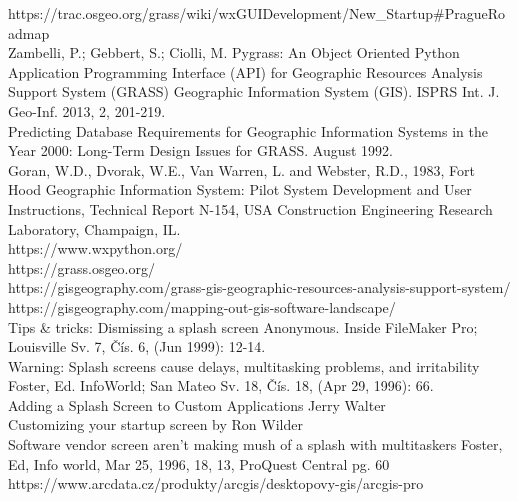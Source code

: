 \documentclass[a4paper,10pt,twoside]{article}
\begin{document}
\noindent
\large

https://trac.osgeo.org/grass/wiki/wxGUIDevelopment/New\_Startup\#PragueRoadmap \\

Zambelli, P.; Gebbert, S.; Ciolli, M. Pygrass: An Object Oriented Python Application Programming Interface (API) for Geographic Resources Analysis Support System (GRASS) Geographic Information System (GIS). ISPRS Int. J. Geo-Inf. 2013, 2, 201-219. \\

Predicting Database Requirements for Geographic Information Systems in the Year 2000: Long-Term Design Issues for GRASS. August 1992.\\

Goran, W.D., Dvorak, W.E., Van Warren, L. and Webster, R.D., 1983, Fort Hood Geographic Information System: Pilot System Development and User Instructions, Technical Report N-154, USA Construction Engineering Research Laboratory, Champaign, IL.\\

https://www.wxpython.org/\\

https://grass.osgeo.org/\\

https://gisgeography.com/grass-gis-geographic-resources-analysis-support-system/\\

https://gisgeography.com/mapping-out-gis-software-landscape/\\

Tips \& tricks: Dismissing a splash screen Anonymous. Inside FileMaker Pro; Louisville Sv. 7, Čís. 6,  (Jun 1999): 12-14. \\

Warning: Splash screens cause delays, multitasking problems, and irritability Foster, Ed. InfoWorld; San Mateo Sv. 18, Čís. 18,  (Apr 29, 1996): 66. \\

Adding a Splash Screen to Custom Applications Jerry Walter \\

Customizing your startup screen by Ron Wilder \\

Software vendor screen aren't making mush of a splash with multitaskers Foster, Ed, Info world, Mar 25, 1996, 18, 13, ProQuest Central pg. 60 \\

https://www.arcdata.cz/produkty/arcgis/desktopovy-gis/arcgis-pro \\
\end{document}
